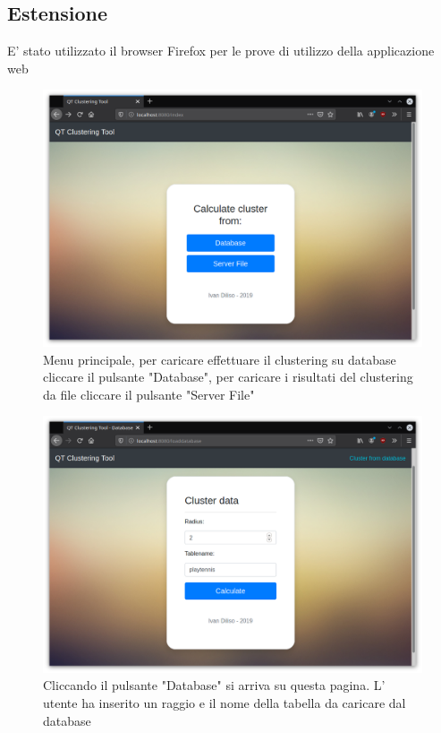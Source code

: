 \documentclass{article}
\begin{document}
 



    \subsection{Estensione}
    E' stato utilizzato il browser Firefox per le prove di utilizzo della 
    applicazione web


    \begin{figure}[H]
        \includegraphics[scale=0.4]{ADDON1}
        \caption{Menu principale, per caricare effettuare il clustering su 
        database cliccare il pulsante "Database", per caricare i risultati del
        clustering da file cliccare il pulsante "Server File"}   
        \label{fig:5}
    \end{figure} 
    \begin{figure}[H]
        \includegraphics[scale=0.4]{ADDON2}
        \caption{Cliccando il pulsante "Database" si arriva su questa pagina. L'
        utente ha inserito un raggio e il nome della tabella da caricare dal
        database }   
        \label{fig:6}
    \end{figure} 
\end{document}
